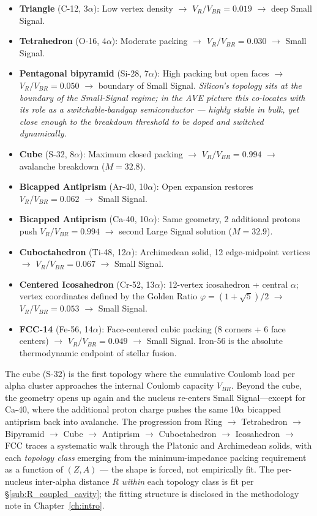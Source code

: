 \begin{itemize}
    \item \textbf{Triangle} (C-12, 3$\alpha$): Low vertex density $\rightarrow$ $V_R/V_{BR} = 0.019$ $\rightarrow$ deep Small Signal.
    \item \textbf{Tetrahedron} (O-16, 4$\alpha$): Moderate packing $\rightarrow$ $V_R/V_{BR} = 0.030$ $\rightarrow$ Small Signal.
    \item \textbf{Pentagonal bipyramid} (Si-28, 7$\alpha$): High packing but open faces $\rightarrow$ $V_R/V_{BR} = 0.050$ $\rightarrow$ boundary of Small Signal. \textit{Silicon's topology sits at the boundary of the Small-Signal regime; in the AVE picture this co-locates with its role as a switchable-bandgap semiconductor --- highly stable in bulk, yet close enough to the breakdown threshold to be doped and switched dynamically.}
    \item \textbf{Cube} (S-32, 8$\alpha$): Maximum closed packing $\rightarrow$ $V_R/V_{BR} = 0.994$ $\rightarrow$ avalanche breakdown ($M = 32.8$).
    \item \textbf{Bicapped Antiprism} (Ar-40, 10$\alpha$): Open expansion restores $V_R/V_{BR} = 0.062$ $\rightarrow$ Small Signal.
    \item \textbf{Bicapped Antiprism} (Ca-40, 10$\alpha$): Same geometry, 2 additional protons push $V_R/V_{BR} = 0.994$ $\rightarrow$ second Large Signal solution ($M = 32.9$).
    \item \textbf{Cuboctahedron} (Ti-48, 12$\alpha$): Archimedean solid, 12 edge-midpoint vertices $\rightarrow$ $V_R/V_{BR} = 0.067$ $\rightarrow$ Small Signal.
    \item \textbf{Centered Icosahedron} (Cr-52, 13$\alpha$): 12-vertex icosahedron + central $\alpha$; vertex coordinates defined by the Golden Ratio $\varphi = (1+\sqrt{5})/2$ $\rightarrow$ $V_R/V_{BR} = 0.053$ $\rightarrow$ Small Signal.
    \item \textbf{FCC-14} (Fe-56, 14$\alpha$): Face-centered cubic packing (8 corners + 6 face centers) $\rightarrow$ $V_R/V_{BR} = 0.049$ $\rightarrow$ Small Signal. Iron-56 is the absolute thermodynamic endpoint of stellar fusion.
\end{itemize}

The cube (S-32) is the first topology where the cumulative Coulomb load per alpha cluster approaches the internal Coulomb capacity $V_{BR}$. Beyond the cube, the geometry opens up again and the nucleus re-enters Small Signal---except for Ca-40, where the additional proton charge pushes the same 10$\alpha$ bicapped antiprism back into avalanche. The progression from Ring $\rightarrow$ Tetrahedron $\rightarrow$ Bipyramid $\rightarrow$ Cube $\rightarrow$ Antiprism $\rightarrow$ Cuboctahedron $\rightarrow$ Icosahedron $\rightarrow$ FCC traces a systematic walk through the Platonic and Archimedean solids, with each \textit{topology class} emerging from the minimum-impedance packing requirement as a function of $(Z, A)$ — the shape is forced, not empirically fit. The per-nucleus inter-alpha distance $R$ \textit{within} each topology class is fit per \S\ref{sub:R_coupled_cavity}; the fitting structure is disclosed in the methodology note in Chapter~\ref{ch:intro}.

